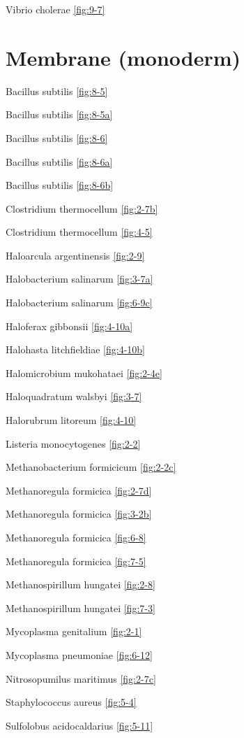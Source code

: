 \documentclass[]{tufte-book}
\begin{document}
Vibrio cholerae \ref{fig:9-7}

\hypertarget{membrane-monoderm}{%
\section*{Membrane (monoderm)}\label{membrane-monoderm}}

Bacillus subtilis \ref{fig:8-5}

Bacillus subtilis \ref{fig:8-5a}

Bacillus subtilis \ref{fig:8-6}

Bacillus subtilis \ref{fig:8-6a}

Bacillus subtilis \ref{fig:8-6b}

Clostridium thermocellum \ref{fig:2-7b}

Clostridium thermocellum \ref{fig:4-5}

Haloarcula argentinensis \ref{fig:2-9}

Halobacterium salinarum \ref{fig:3-7a}

Halobacterium salinarum \ref{fig:6-9c}

Haloferax gibbonsii \ref{fig:4-10a}

Halohasta litchfieldiae \ref{fig:4-10b}

Halomicrobium mukohataei \ref{fig:2-4e}

Haloquadratum walsbyi \ref{fig:3-7}

Halorubrum litoreum \ref{fig:4-10}

Listeria monocytogenes \ref{fig:2-2}

Methanobacterium formicicum \ref{fig:2-2c}

Methanoregula formicica \ref{fig:2-7d}

Methanoregula formicica \ref{fig:3-2b}

Methanoregula formicica \ref{fig:6-8}

Methanoregula formicica \ref{fig:7-5}

Methanospirillum hungatei \ref{fig:2-8}

Methanospirillum hungatei \ref{fig:7-3}

Mycoplasma genitalium \ref{fig:2-1}

Mycoplasma pneumoniae \ref{fig:6-12}

Nitrosopumilus maritimus \ref{fig:2-7c}

Staphylococcus aureus \ref{fig:5-4}

Sulfolobus acidocaldarius \ref{fig:5-11}
\end{document}
